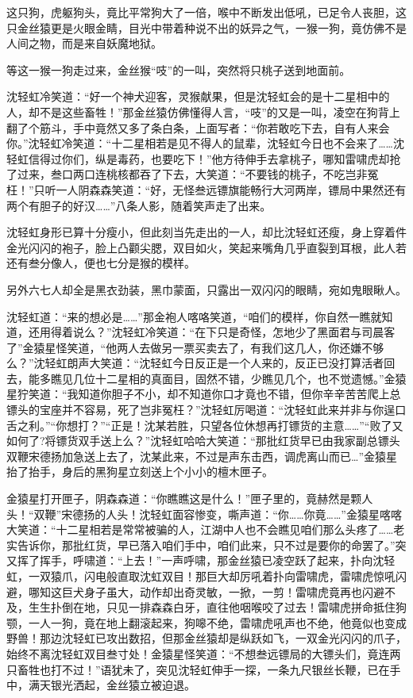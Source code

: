 \documentclass[12pt,oneside]{book}
\begin{document}
这只狗，虎躯狗头，竟比平常狗大了一倍，喉中不断发出低吼，已足令人丧胆，这只金丝猿更是火眼金睛，目光中带着种说不出的妖异之气，一猴一狗，竟仿佛不是人间之物，而是来自妖魔地狱。

等这一猴一狗走过来，金丝猴``吱''的一叫，突然将只桃子送到地面前。

沈轻虹冷笑道：``好一个神犬迎客，灵猴献果，但是沈轻虹会的是十二星相中的人，却不是这些畜牲！''那金丝猿仿佛懂得人言，``吱''的又是一叫，凌空在狗背上翻了个筋斗，手中竟然又多了条白条，上面写者：``你若敢吃下去，自有人来会你。''沈轻虹冷笑道：``十二星相若是见不得人的鼠辈，沈轻虹今日也不会来了\ldots\ldots 沈轻虹信得过你们，纵是毒药，也要吃下！''他方待伸手去拿桃子，哪知雷啸虎却抢了过来，叁口两口连桃核都吞了下去，大笑道：``不要钱的桃子，不吃岂非冤枉！''只听一人阴森森笑道：``好，无怪叁远镖旗能畅行大河两岸，镖局中果然还有两个有胆子的好汉\ldots\ldots{}''八条人影，随着笑声走了出来。

沈轻虹身形已算十分瘦小，但此刻当先走出的一人，却比沈轻虹还瘦，身上穿着件金光闪闪的袍子，脸上凸颧尖腮，双目如火，笑起来嘴角几乎直裂到耳根，此人若还有叁分像人，便也七分是猴的模样。

另外六七人却全是黑衣劲装，黑巾蒙面，只露出一双闪闪的眼睛，宛如鬼眼瞅人。

沈轻虹道：``来的想必是\ldots\ldots{}''那金袍人喀咯笑道，``咱们的模样，你自然一瞧就知道，还用得着说么？''沈轻虹冷笑道：``在下只是奇怪，怎地少了黑面君与司晨客了''金猿星怪笑道，``他两人去做另一票买卖去了，有我们这几人，你还嫌不够么？''沈轻虹朗声大笑道：``沈轻虹今日反正是一个人来的，反正已没打算活者回去，能多瞧见几位十二星相的真面目，固然不错，少瞧见几个，也不觉遗憾。''金猿星狞笑道：``我知道你胆子不小，却不知道你口才竟也不错，但你辛辛苦苦爬上总镖头的宝座并不容易，死了岂非冤枉？''沈轻虹厉喝道：``沈轻虹此来并非与你逞口舌之利。''``你想打？''``正是！沈某若胜，只望各位休想再打镖货的主意\ldots\ldots{}''``败了又如何了?将镖货双手送上么？''沈轻虹哈哈大笑道：``那批红货早已由我家副总镖头双鞭宋德扬加急送上去了，沈某此来，不过是声东击西，调虎离山而已\ldots{}''金猿星抬了抬手，身后的黑狗星立刻送上个小小的檀木匣子。

金猿星打开匣子，阴森森道：``你瞧瞧这是什么！''匣子里的，竟赫然是颗人头！``双鞭''宋德扬的人头！沈轻虹面容惨变，嘶声道：``你\ldots\ldots 你竟\ldots\ldots{}''金猿星喀喀大笑道：``十二星相若是常常被骗的人，江湖中人也不会瞧见咱们那么头疼了\ldots\ldots 老实告诉你，那批红货，早已落入咱们手中，咱们此来，只不过是要你的命罢了。''突又挥了挥手，呼啸道：``上去！''一声呼啸，那金丝猿已凌空跃了起来，扑向沈轻虹，一双猿爪，闪电般直取沈虹双目！那巨大却厉吼着扑向雷啸虎，雷啸虎惊吼闪避，哪知这巨犬身子虽大，动作却出奇灵敏，一掀，一剪！雷啸虎竟再也闪避不及，生生扑倒在地，只见一排森森白牙，直往他咽喉咬了过去！雷啸虎拼命抵住狗颚，一人一狗，竟在地上翻滚起来，狗嗥不绝，雷啸虎吼声也不绝，他竟似也变成野兽！那边沈轻虹已攻出数招，但那金丝猿却是纵跃如飞，一双金光闪闪的爪子，始终不离沈轻虹双目叁寸处！金猿星怪笑道：``不想叁远镖局的大镖头们，竟连两只畜牲也打不过！''语犹未了，突见沈轻虹伸手一探，一条九尺银丝长鞭，已在手中，满天银光洒起，金丝猿立被迫退。
\end{document}

